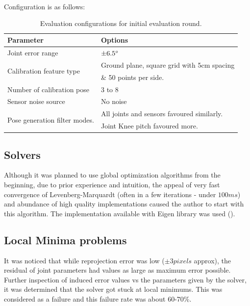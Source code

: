 \documentclass[english, printversion, nomenclature, notitle]{tuvisionthesis} %
\makeatletter
\renewcommand{\todo}[2][]{\tikzexternaldisable\@todo[#1]{#2}\tikzexternalenable}
\makeatother
\begin{document}
Configuration is as follows:
\begin{table}[H]
	\begin{tabular}{|l|l|}
		\hline
		\textbf{Parameter} & \textbf{Options} \\ 
		\hline
		Joint error range
			& $\pm 6.5\degree$ \\ 
		\hline
		\multirow{2}{*}{Calibration feature type}
			& Ground plane, square grid with 5cm spacing  \\
			&\& 50 points per side. \\ 
		\hline
		Number of calibration pose
			&3 to 8\\ 
		\hline
		Sensor noise source
		& No noise \\ 
		\hline
		\multirow{2}{*}{Pose generation filter modes.}
		& All joints and sensors favoured similarly. \\ \cline{2-2}
		& Joint Knee pitch favoured more. \\ 
		\hline
	\end{tabular}
	\caption{Evaluation configurations for initial evaluation round.}
	\label{tab:initial_test_config}
\end{table}

\subsection{Solvers}

Although it was planned to use global optimization algorithms from the beginning, due to prior experience and intuition, the appeal of very fast convergence of Levenberg-Marquardt (often in a few iterations - under $100ms$) and abundance of high quality implementations caused the author to start with this algorithm. The implementation available with Eigen library was used (\todo{cite Eigen/unsupported}).

\subsection{Local Minima problems}
It was noticed that while reprojection error was low ($\pm3 pixels$ approx), the residual of joint parameters had values as large as maximum error possible. Further inspection of induced error values vs the parameters given by the solver, it was determined that the solver got stuck at local minimums. This was considered as a failure and this failure rate was about 60-70\%.
\end{document}
